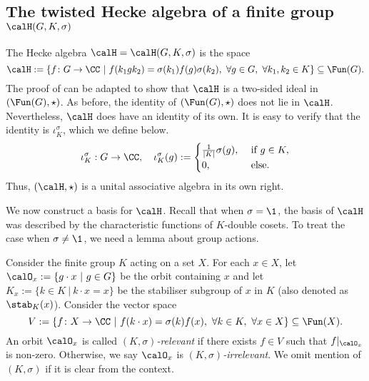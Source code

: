 
\subsection{The twisted Hecke algebra of a finite group $\calH(G,K,\sigma)$}\label{Section2.2}
The Hecke algebra $\calH = \calH(G,K,\sigma)$ is the space
\[
    \calH := \{f\colon G\to \CC\ |\ f(k_1gk_2) = \sigma(k_1)f(g)\sigma(k_2),\ \forall g\in G,\ \forall k_1,k_2\in K\} \subseteq \Fun(G).
\]
The proof of  can be adapted to show that $\calH$ is a two-sided ideal in $(\Fun(G),\star)$.
As before, the identity of $(\Fun(G),\star)$ does not lie in $\calH$.
Nevertheless, $\calH$ does have an identity of its own.
It is easy to verify that the identity is $\iota_K^\sigma$, which we define below.
\[
    \iota_K^\sigma:G\to\CC,\quad \iota_K^\sigma(g) := \begin{cases}
        \frac{1}{|K|}\sigma(g),\  & \text{if}\ g\in K, \\
        0,\                       & \text{else}.
    \end{cases}
\]
Thus, $(\calH,\star)$ is a unital associative algebra in its own right.

We now construct a basis for $\calH$.
Recall that when $\sigma=\1$, the basis of $\calH$ was described by the characteristic functions of $K$-double cosets.
To treat the case when $\sigma\neq\1$, we need a lemma about group actions.

Consider the finite group $K$ acting on a set $X$.
For each $x\in X$, let $\calO_x := \{g\cdot x\ |\ g\in G\}$ be the orbit containing $x$ and let $K_x := \{k\in K\ |\ k\cdot x = x\}$ be the stabiliser subgroup of $x$ in $K$ (also denoted as $\stab_K(x)$).
Consider the vector space
\[
    V := \{f\colon X\to\CC\ |\ f(k\cdot x) = \sigma(k)f(x),\ \forall k\in K,\ \forall x\in X\}\subseteq \Fun(X).
\]
An orbit $\calO_x$ is called \emph{$(K,\sigma)$-relevant} if there exists $f\in V$ such that $f|_{\calO_x}$ is non-zero.
Otherwise, we say $\calO_x$ is \emph{$(K,\sigma)$-irrelevant}.
We omit mention of $(K,\sigma)$ if it is clear from the context.

